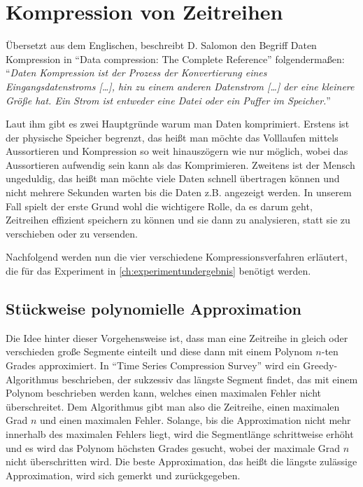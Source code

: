 \section{Kompression von Zeitreihen}
Übersetzt aus dem Englischen, beschreibt D. Salomon den Begriff Daten Kompression in "`Data compression: The Complete Reference"' \cite[p. 1-2]{dataCompressionSalmon} folgendermaßen: "`\textit{Daten Kompression ist der Prozess der Konvertierung eines Eingangsdatenstroms [\ldots], hin zu einem anderen Datenstrom [\ldots] der eine kleinere Größe hat. Ein Strom ist entweder eine Datei oder ein Puffer im Speicher.}"'

Laut ihm gibt es zwei Hauptgründe warum man Daten komprimiert. Erstens ist der physische Speicher begrenzt, das heißt man möchte das Volllaufen mittels Aussortieren und Kompression so weit hinauszögern wie nur möglich, wobei das Aussortieren aufwendig sein kann als das Komprimieren. Zweitens ist der Mensch ungeduldig, das heißt man möchte viele Daten schnell übertragen können und nicht mehrere Sekunden warten bis die Daten z.B. angezeigt werden. In unserem Fall spielt der erste Grund wohl die wichtigere Rolle, da es darum geht, Zeitreihen effizient speichern zu können und sie dann zu analysieren, statt sie zu verschieben oder zu versenden.

Nachfolgend werden nun die vier verschiedene Kompressionsverfahren erläutert, die für das Experiment in \autoref{ch:experimentundergebnis} benötigt werden.

\subsection{Stückweise polynomielle Approximation}\label{subsec:ppa}
Die Idee hinter dieser Vorgehensweise ist, dass man eine Zeitreihe in gleich oder verschieden große Segmente einteilt und diese dann mit einem Polynom $n$-ten Grades approximiert. In "`Time Series Compression Survey"' \cite[Ch. 4.2.1]{compressionSurvey} wird ein Greedy-Algorithmus beschrieben, der sukzessiv das längste Segment findet, das mit einem Polynom beschrieben werden kann, welches einen maximalen Fehler nicht überschreitet. Dem Algorithmus gibt man also die Zeitreihe, einen maximalen Grad $n$ und einen maximalen Fehler. Solange, bis die Approximation nicht mehr innerhalb des maximalen Fehlers liegt, wird die Segmentlänge schrittweise erhöht und es wird das Polynom höchsten Grades gesucht, wobei der maximale Grad $n$ nicht überschritten wird. Die beste Approximation, das heißt die längste zulässige Approximation, wird sich gemerkt und zurückgegeben.

